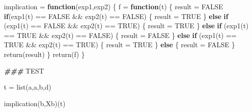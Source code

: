 \documentclass[
]{article}
\newenvironment{Shaded}{\begin{snugshade}}{\end{snugshade}}
\newcommand{\AlertTok}[1]{\textcolor[rgb]{0.94,0.16,0.16}{#1}}
\newcommand{\ConstantTok}[1]{\textcolor[rgb]{0.00,0.00,0.00}{#1}}
\newcommand{\ControlFlowTok}[1]{\textcolor[rgb]{0.13,0.29,0.53}{\textbf{#1}}}
\newcommand{\DocumentationTok}[1]{\textcolor[rgb]{0.56,0.35,0.01}{\textbf{\textit{#1}}}}
\newcommand{\FunctionTok}[1]{\textcolor[rgb]{0.00,0.00,0.00}{#1}}
\newcommand{\NormalTok}[1]{#1}
\newcommand{\OtherTok}[1]{\textcolor[rgb]{0.56,0.35,0.01}{#1}}
\newcommand{\SpecialCharTok}[1]{\textcolor[rgb]{0.00,0.00,0.00}{#1}}
\newcommand{\StringTok}[1]{\textcolor[rgb]{0.31,0.60,0.02}{#1}}
\begin{document}
\begin{Shaded}
\begin{Highlighting}[]
\NormalTok{implication }\OtherTok{=} \ControlFlowTok{function}\NormalTok{(exp1,exp2)}
\NormalTok{\{}
\NormalTok{    f }\OtherTok{=} \ControlFlowTok{function}\NormalTok{(t)}
\NormalTok{    \{}
\NormalTok{    result }\OtherTok{=} \ConstantTok{FALSE}
      \ControlFlowTok{if}\NormalTok{(}\FunctionTok{exp1}\NormalTok{(t) }\SpecialCharTok{==} \ConstantTok{FALSE} \SpecialCharTok{\&\&} \FunctionTok{exp2}\NormalTok{(t) }\SpecialCharTok{==} \ConstantTok{FALSE}\NormalTok{)}
\NormalTok{      \{}
\NormalTok{        result }\OtherTok{=} \ConstantTok{TRUE}  
\NormalTok{      \}}
      \ControlFlowTok{else} \ControlFlowTok{if}\NormalTok{ (}\FunctionTok{exp1}\NormalTok{(t) }\SpecialCharTok{==} \ConstantTok{FALSE} \SpecialCharTok{\&\&} \FunctionTok{exp2}\NormalTok{(t) }\SpecialCharTok{==} \ConstantTok{TRUE}\NormalTok{)}
\NormalTok{      \{}
\NormalTok{        result }\OtherTok{=} \ConstantTok{TRUE} 
\NormalTok{      \}}
      \ControlFlowTok{else} \ControlFlowTok{if}\NormalTok{ (}\FunctionTok{exp1}\NormalTok{(t) }\SpecialCharTok{==} \ConstantTok{TRUE} \SpecialCharTok{\&\&} \FunctionTok{exp2}\NormalTok{(t) }\SpecialCharTok{==} \ConstantTok{FALSE}\NormalTok{)}
\NormalTok{      \{}
\NormalTok{        result }\OtherTok{=} \ConstantTok{FALSE} 
\NormalTok{      \}}
      \ControlFlowTok{else} \ControlFlowTok{if}\NormalTok{ (}\FunctionTok{exp1}\NormalTok{(t) }\SpecialCharTok{==} \ConstantTok{TRUE} \SpecialCharTok{\&\&} \FunctionTok{exp2}\NormalTok{(t) }\SpecialCharTok{==} \ConstantTok{TRUE}\NormalTok{)}
\NormalTok{      \{}
\NormalTok{        result }\OtherTok{=} \ConstantTok{TRUE} 
\NormalTok{      \}}
      \ControlFlowTok{else} 
\NormalTok{      \{}
\NormalTok{        result }\OtherTok{=} \ConstantTok{FALSE}
\NormalTok{      \}}
    \FunctionTok{return}\NormalTok{(result)}
\NormalTok{    \}}
  \FunctionTok{return}\NormalTok{(f)}
\NormalTok{\}}

\DocumentationTok{\#\#\# }\AlertTok{TEST}\DocumentationTok{ }

\NormalTok{t }\OtherTok{=} \FunctionTok{list}\NormalTok{(}\StringTok{\textquotesingle{}a\textquotesingle{}}\NormalTok{,}\StringTok{\textquotesingle{}a\textquotesingle{}}\NormalTok{,}\StringTok{\textquotesingle{}b\textquotesingle{}}\NormalTok{,}\StringTok{\textquotesingle{}d\textquotesingle{}}\NormalTok{)}

\FunctionTok{implication}\NormalTok{(b,Xb)(t)}
\end{Highlighting}
\end{Shaded}
\end{document}
